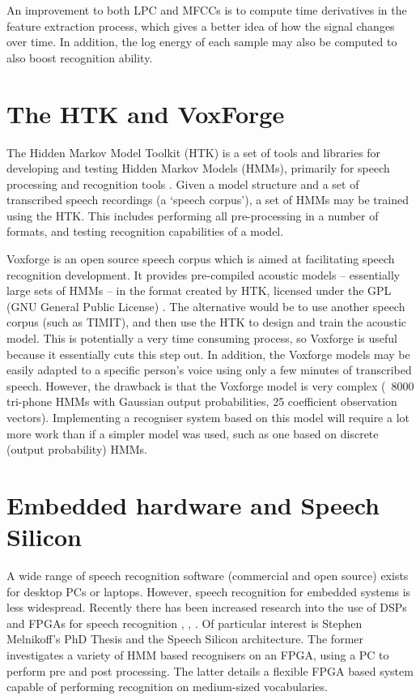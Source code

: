 An improvement to both LPC and MFCCs is to compute time derivatives in the feature extraction process, which gives a better idea of how the signal changes over time.  In addition, the log energy of each sample may also be computed to also boost recognition ability.



\section{The HTK and VoxForge} %
\label{sec:the_htk}
The Hidden Markov Model Toolkit (HTK) is a set of tools and libraries for developing and testing Hidden Markov Models (HMMs), primarily for speech processing and recognition tools \cite{htkbook}.  Given a model structure and a set of transcribed speech recordings (a `speech corpus'), a set of HMMs may be trained using the HTK.  This includes performing all pre-processing in a number of formats, and testing recognition capabilities of a model.

Voxforge is an open source speech corpus which is aimed at facilitating speech recognition development.  It provides pre-compiled acoustic models -- essentially large sets of HMMs -- in the format created by HTK, licensed under the GPL (GNU General Public License) \cite{voxforge}.  The alternative would be to use another speech corpus (such as TIMIT), and then use the HTK to design and train the acoustic model.  This is potentially a very time consuming process, so Voxforge is useful because it essentially cuts this step out.  In addition, the Voxforge models may be easily adapted to a specific person's voice using only a few minutes of transcribed speech.  However, the drawback is that the Voxforge model is very complex (~8000 tri-phone HMMs with Gaussian output probabilities, 25 coefficient observation vectors).  Implementing a recogniser system based on this model will require a lot more work than if a simpler model was used, such as one based on discrete (output probability) HMMs.


\section{Embedded hardware and Speech Silicon} %
\label{sec:embedded_hardware}
A wide range of speech recognition software (commercial and open source) exists for desktop PCs or laptops.  However, speech recognition for embedded systems is less widespread.  Recently there has been increased research into the use of DSPs and FPGAs for speech recognition \cite{melnikoff2003speech}, \cite{schuster2006speech}, \cite{nedevschi2005hardware}.  Of particular interest is Stephen Melnikoff's PhD Thesis and the Speech Silicon architecture.  The former investigates a variety of HMM based recognisers on an FPGA, using a PC to perform pre and post processing.  The latter details a flexible FPGA based system capable of performing recognition on medium-sized vocabularies.



